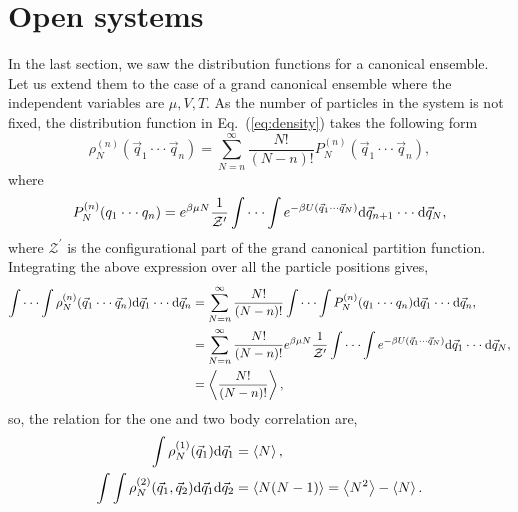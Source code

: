 \documentclass[a4paper]{article}
\begin{document}
\section{Open systems}
In the last section, we saw the distribution functions for a canonical ensemble. Let us extend them to the case of a grand canonical ensemble where the independent variables are $\mu,V,T$. As the number of particles in the system is not fixed, the distribution function in Eq.~(\ref{eq:density}) takes the following form
\begin{equation}
\rho^{(n)}_{N}(\vec{q}_{1}\cdot\cdot\cdot \vec{q}_{n})=\sum_{N=n}^{\infty}\frac{N!}{\left(N-n\right)!}P^{(n)}_{N}(\vec{q}_{1}\cdot\cdot\cdot \vec{q}_{n}),
\end{equation}
where 
\begin{equation}
P^{(n)}_{N}(q_{1}\cdot\cdot\cdot q_{n})=e^{\beta\mu N}\frac{1}{\mathcal{Z}^{\prime}}\int\cdot\cdot\cdot\int e^{-\beta U(\vec{q}_{1}\cdot\cdot\cdot \vec{q}_{N})}{\rm d}\vec{q}_{n+1}\cdot\cdot\cdot{\rm d}\vec{q}_{N},
\end{equation}
where $\mathcal{Z}^{\prime}$ is the configurational part of the grand canonical partition function.
Integrating the above expression over all the particle positions gives,
\begin{equation}
\begin{split}
\int\cdot\cdot\cdot\int\rho^{(n)}_{N}(\vec{q}_{1}\cdot\cdot\cdot \vec{q}_{n}){\rm d}\vec{q}_{1}\cdot\cdot\cdot{\rm d} \vec{q}_{n}&=\sum_{N=n}^{\infty}\frac{N!}{\left(N-n\right)!}\int \cdot\cdot\cdot \int P^{(n)}_{N}(q_{1}\cdot\cdot\cdot q_{n}){\rm d}\vec{q}_{1}\cdot\cdot\cdot{\rm d}\vec{q}_{n},\\
&=\sum_{N=n}^{\infty}\frac{N!}{\left(N-n\right)!}e^{\beta\mu N}\frac{1}{\mathcal{Z}^{\prime}}\int\cdot\cdot\cdot\int e^{-\beta U(\vec{q}_{1}\cdot\cdot\cdot \vec{q}_{N})}{\rm d}\vec{q}_{1}\cdot\cdot\cdot{\rm d}\vec{q}_{N},\\
&=\left<\frac{N!}{\left(N-n\right)!}\right>,
\end{split}
\end{equation}
so, the relation for the one and two body correlation are,
\begin{equation}
\begin{split}
\int\rho^{(1)}_{N}(\vec{q}_{1}){\rm d}\vec{q}_{1}&=\left<N\right>,\\
\int\int\rho^{(2)}_{N}(\vec{q}_{1},\vec{q}_{2}){\rm d}\vec{q}_{1}{\rm d}\vec{q}_{2}&=\left<N(N-1)\right>=\left<N^{2}\right>-\left<N\right>.\\
\end{split}
\end{equation}
\end{document}
